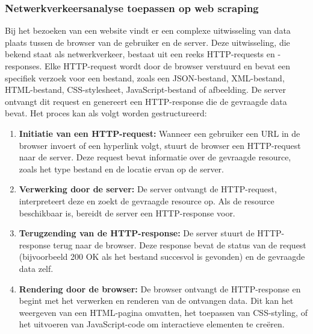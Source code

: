 \subsubsection{Netwerkverkeersanalyse toepassen op web scraping}
Bij het bezoeken van een website vindt er een complexe uitwisseling van data plaats tussen de browser van de gebruiker en de server. Deze uitwisseling, die bekend staat als netwerkverkeer, bestaat uit een reeks HTTP-requests en -responses.
Elke HTTP-request wordt door de browser verstuurd en bevat een specifiek verzoek voor een bestand, zoals een JSON-bestand, XML-bestand, HTML-bestand, CSS-stylesheet, JavaScript-bestand of afbeelding. De server ontvangt dit request en genereert een HTTP-response die de gevraagde data bevat. Het proces kan als volgt worden gestructureerd:
\begin{enumerate}
    \item \textbf{Initiatie van een HTTP-request:} Wanneer een gebruiker een URL in de browser invoert of een hyperlink volgt, stuurt de browser een HTTP-request naar de server. Deze request bevat informatie over de gevraagde resource, zoals het type bestand en de locatie ervan op de server.

    \item \textbf{Verwerking door de server:} De server ontvangt de HTTP-request, interpreteert deze en zoekt de gevraagde resource op. Als de resource beschikbaar is, bereidt de server een HTTP-response voor.

    \item \textbf{Terugzending van de HTTP-response:} De server stuurt de HTTP-response terug naar de browser. Deze response bevat de status van de request (bijvoorbeeld 200 OK als het bestand succesvol is gevonden) en de gevraagde data zelf.

    \item \textbf{Rendering door de browser:} De browser ontvangt de HTTP-response en begint met het verwerken en renderen van de ontvangen data. Dit kan het weergeven van een HTML-pagina omvatten, het toepassen van CSS-styling, of het uitvoeren van JavaScript-code om interactieve elementen te creëren.
\end{enumerate}

